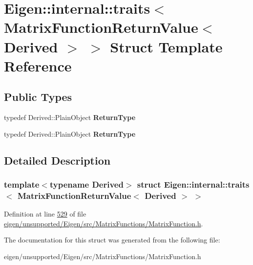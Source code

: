 \hypertarget{struct_eigen_1_1internal_1_1traits_3_01_matrix_function_return_value_3_01_derived_01_4_01_4}{}\section{Eigen\+:\+:internal\+:\+:traits$<$ Matrix\+Function\+Return\+Value$<$ Derived $>$ $>$ Struct Template Reference}
\label{struct_eigen_1_1internal_1_1traits_3_01_matrix_function_return_value_3_01_derived_01_4_01_4}
\subsection*{Public Types}
\begin{DoxyCompactItemize}
\item 
\mbox{\label{struct_eigen_1_1internal_1_1traits_3_01_matrix_function_return_value_3_01_derived_01_4_01_4_a0c0a5530187b748e2759534e5e185b58}} 
typedef Derived\+::\+Plain\+Object {\bfseries Return\+Type}
\item 
\mbox{\label{struct_eigen_1_1internal_1_1traits_3_01_matrix_function_return_value_3_01_derived_01_4_01_4_a0c0a5530187b748e2759534e5e185b58}} 
typedef Derived\+::\+Plain\+Object {\bfseries Return\+Type}
\end{DoxyCompactItemize}


\subsection{Detailed Description}
\subsubsection*{template$<$typename Derived$>$\newline
struct Eigen\+::internal\+::traits$<$ Matrix\+Function\+Return\+Value$<$ Derived $>$ $>$}



Definition at line \hyperlink{eigen_2unsupported_2_eigen_2src_2_matrix_functions_2_matrix_function_8h_source_l00529}{529} of file \hyperlink{eigen_2unsupported_2_eigen_2src_2_matrix_functions_2_matrix_function_8h_source}{eigen/unsupported/\+Eigen/src/\+Matrix\+Functions/\+Matrix\+Function.\+h}.



The documentation for this struct was generated from the following file\+:\begin{DoxyCompactItemize}
\item 
eigen/unsupported/\+Eigen/src/\+Matrix\+Functions/\+Matrix\+Function.\+h\end{DoxyCompactItemize}
